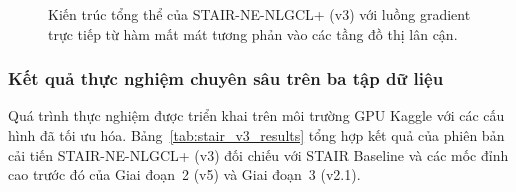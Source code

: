 \begin{figure}[H]
\caption{Kiến trúc tổng thể của STAIR-NE-NLGCL+ (v3) với luồng gradient trực tiếp từ hàm mất mát tương phản vào các tầng đồ thị lân cận.}
\label{fig:stair_v3_architecture}
\end{figure}

\subsubsection{Kết quả thực nghiệm chuyên sâu trên ba tập dữ liệu}

Quá trình thực nghiệm được triển khai trên môi trường GPU Kaggle với các cấu hình đã tối ưu hóa. Bảng~\ref{tab:stair_v3_results} tổng hợp kết quả của phiên bản cải tiến STAIR-NE-NLGCL+ (v3) đối chiếu với STAIR Baseline và các mốc đỉnh cao trước đó của Giai đoạn~2 (v5) và Giai đoạn~3 (v2.1).

